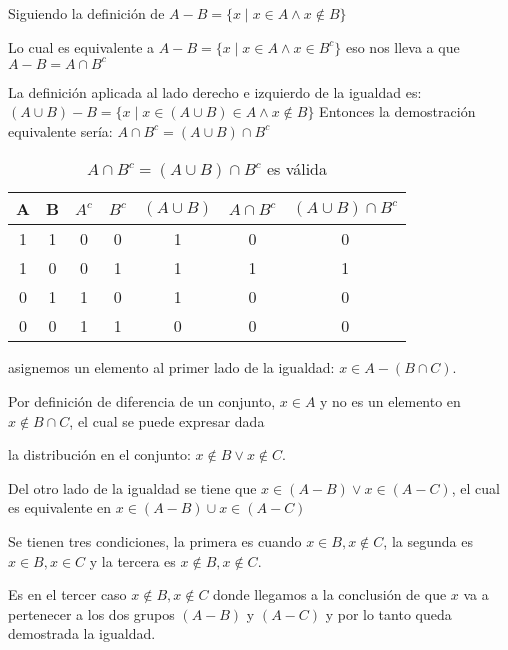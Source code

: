 \begin{example}[Sean $A$ y $B$, subconjuntos de $U$ (conuntos universo) demuestre que $A-B=(A\cup B)-B$]
	Siguiendo la definición de $A-B=\{ x\mid x\in A \land x \notin B \}$

	Lo cual es equivalente a $A-B=\{ x\mid x\in A \land x \in B^{c} \}$
	eso nos lleva a que $A-B=A\cap B^{c}$

	La definición aplicada al lado derecho e izquierdo de la igualdad es:
	$(A\cup B)-B=\{ x\mid x\in (A\cup B) \in A \land x \notin B \}$
	Entonces la demostración equivalente sería: $A\cap B^{c}=(A\cup B)\cap B^{c}$
	\begin{table}[h!]
		\centering
		\begin{tabular}{|c|c|c|c|c|c|c|}
			\hline
			A & B & $A^{c}$ & $B^{c}$ & $(A\cup B)$ & $A\cap B^{c}$ & $(A\cup B)\cap B^{c}$ \\ \hline
			1 & 1 & 0       & 0       & 1           & 0             & 0                     \\ \hline
			1 & 0 & 0       & 1       & 1           & 1             & 1                     \\ \hline
			0 & 1 & 1       & 0       & 1           & 0             & 0                     \\ \hline
			0 & 0 & 1       & 1       & 0           & 0             & 0                     \\ \hline
		\end{tabular}
		\caption{$A\cap B^{c}=(A\cup B)\cap B^{c}$ es válida}
		\label{tabfmc17}
	\end{table}
\end{example}

\begin{problem}[Demuestre que $A-(B\cap C)=(A-B)\cup (A-C)$]
asignemos un elemento al primer lado de la igualdad: $x\in A-(B\cap C)$.

Por definición de diferencia de un conjunto, $x\in A$ y no es un elemento en $x\notin B\cap C$, el cual se puede expresar dada

la distribución en el conjunto: $x\notin B\lor x\notin C$.

Del otro lado de la igualdad se tiene que $x\in (A-B) \lor x\in (A-C)$, el cual es equivalente en $x\in (A-B) \cup x\in (A-C)$

Se tienen tres condiciones, la primera es cuando $x\in B, x\notin C$, la segunda es $x\in B, x\in C$ y la tercera es $x\notin B, x\notin C$.

Es en el tercer caso $x\notin B, x\notin C$ donde llegamos a la conclusión de que $x$ va a pertenecer a los dos grupos $(A-B)$ y $(A-C)$
y por lo tanto queda demostrada la igualdad.
\end{problem}

